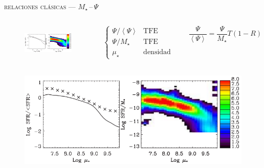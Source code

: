 \documentclass[xcolor=dvipsnames,4pt,fleqn,hyperref={colorlinks,citecolor=black,linkcolor=black,urlcolor=black}]{beamer}
\begin{document}
\begin{frame}{\textsc{relaciones clásicas --- $M_\star\,$--$\,\Psi$}}

\begin{columns}
\begin{figure}
\flushleft\citep{Brinchmann2004}
\includegraphics[scale=0.7]{img/brinchmann2004-24}
\end{figure}

\begin{equation*}
\begin{cases}
\Psi/\left<\Psi\right> & \text{TFE relativa}   \\
\Psi/M_\star           & \text{TFE específica} \\
\mu_\star              & \text{densidad superficial}
\end{cases}
\end{equation*}

\begin{equation*}
\frac{\Psi}{\left<\Psi\right>} = \frac{\Psi}{M_\star}T(1-R)
\end{equation*}

\end{columns}

\begin{columns}
\begin{figure}
\includegraphics[scale=0.7]{img/brinchmann2004-25}
\end{figure}


\end{columns}
\end{frame}
\end{document}
